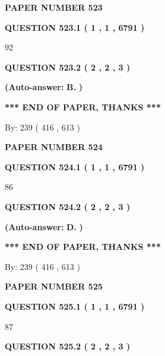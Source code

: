 \documentclass[12pt]{article}
\begin{document}
   
\newpage 
\setcounter{page}{ 
   523001 } 
   
   
 {\textbf{ \Large{ PAPER NUMBER  523  }}}
   
   
   
   
  
  
{\textbf{\large{QUESTION
523.1 
 ( 1 , 1 , 6791 )
}}}

92
  
  
{\textbf{\large{QUESTION
523.2 
 ( 2 , 2 , 3 )
}}}
 
 
{\textbf{(Auto-answer:}}
{\textbf{\large{
B.}}}
{\textbf{)}}
 
 
   
   
   
   
\vspace{1.0in} 
{\textbf{\large{ *** END OF PAPER, THANKS *** }}} 
   
   
\hspace{1.0in} By: 
 239 ( 416 ,  613 )
   
   
   
   
\newpage 
\setcounter{page}{ 
   524001 } 
   
   
 {\textbf{ \Large{ PAPER NUMBER  524  }}}
   
   
   
   
  
  
{\textbf{\large{QUESTION
524.1 
 ( 1 , 1 , 6791 )
}}}

86
  
  
{\textbf{\large{QUESTION
524.2 
 ( 2 , 2 , 3 )
}}}
 
 
{\textbf{(Auto-answer:}}
{\textbf{\large{
D.}}}
{\textbf{)}}
 
 
   
   
   
   
\vspace{1.0in} 
{\textbf{\large{ *** END OF PAPER, THANKS *** }}} 
   
   
\hspace{1.0in} By: 
 239 ( 416 ,  613 )
   
   
   
   
\newpage 
\setcounter{page}{ 
   525001 } 
   
   
 {\textbf{ \Large{ PAPER NUMBER  525  }}}
   
   
   
   
  
  
{\textbf{\large{QUESTION
525.1 
 ( 1 , 1 , 6791 )
}}}

87
  
  
{\textbf{\large{QUESTION
525.2 
 ( 2 , 2 , 3 )
}}}
 
\end{document}
